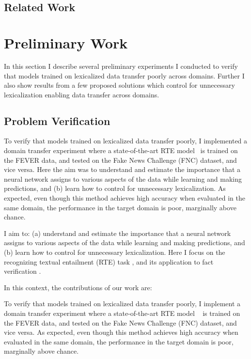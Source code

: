\documentclass[conference,onecolumn]{IEEEtran}
\begin{document}
\subsection{Related Work}

\section*{Preliminary Work}


In this section I describe several preliminary experiments I conducted to verify that models trained on lexicalized data transfer poorly across domains. Further I also show results from a few proposed solutions which control for unnecessary lexicalization enabling data transfer across domains.
 
\subsection{Problem Verification}

To verify that models trained on lexicalized data transfer poorly, I implemented a domain transfer experiment where a state-of-the-art RTE model~\cite{parikh2016decomposable}  is trained on the FEVER data, and tested on the Fake News Challenge (FNC) \cite{pomerleau2017fake} dataset, and vice versa. Here the aim was to understand and estimate the importance that a neural network assigns to various aspects of the data while learning and making predictions, and (b) learn how to control for unnecessary lexicalization.
As expected, even though this method achieves high accuracy when evaluated in the same domain, the performance in the target domain is poor, marginally above chance.

 I aim to: (a) understand and estimate the importance that a neural network assigns to various aspects of the data while learning and making predictions, and (b) learn how to control for unnecessary lexicalization. Here I focus on the recognizing textual entailment (RTE) task \cite{dagan2013recognizing}, and its application to fact verification \cite{thorne2018fever, pomerleau2017fake}.


In this context, the contributions of our work are:

{} To verify that models trained on lexicalized data transfer poorly, I implement a domain transfer experiment where a state-of-the-art RTE model ~\cite{parikh2016decomposable}  is trained on the FEVER data, and tested on the Fake News Challenge (FNC) \cite{pomerleau2017fake} 
dataset, and vice versa. As expected, even though this method achieves high accuracy when evaluated in the same domain, the performance in the target domain is poor, marginally above chance.
 
\end{document}
